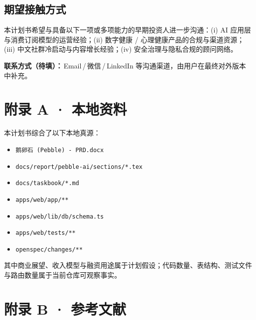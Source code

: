 \documentclass[UTF8,11pt,a4paper]{ctexart}
\begin{document}
\subsection{期望接触方式}

本计划书希望与具备以下一项或多项能力的早期投资人进一步沟通：(i) AI 应用层与消费订阅模型的运营经验；(ii) 数字健康 / 心理健康产品的合规与渠道资源；(iii) 中文社群冷启动与内容增长经验；(iv) 安全治理与隐私合规的顾问网络。

\vspace{2mm}
\begin{keyfinding}
\textbf{联系方式（待填）：}\,Email\,/\,微信\,/\,LinkedIn 等沟通渠道，由用户在最终对外版本中补充。
\end{keyfinding}

\section*{附录 A · 本地资料}

本计划书综合了以下本地真源：

\begin{itemize}
  \item \texttt{鹅卵石 (Pebble) - PRD.docx}
  \item \texttt{docs/report/pebble-ai/sections/*.tex}
  \item \texttt{docs/taskbook/*.md}
  \item \texttt{apps/web/app/**}
  \item \texttt{apps/web/lib/db/schema.ts}
  \item \texttt{apps/web/tests/**}
  \item \texttt{openspec/changes/**}
\end{itemize}

其中商业展望、收入模型与融资用途属于计划假设；代码数量、表结构、测试文件与路由数量属于当前仓库可观察事实。

\section*{附录 B · 参考文献}
\end{document}
